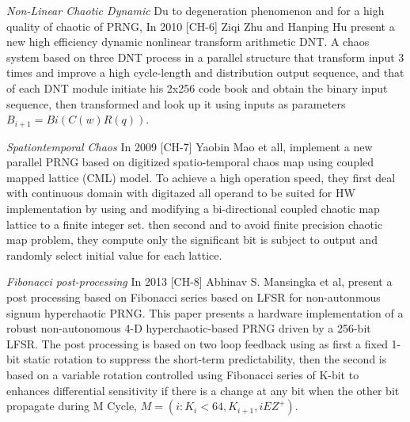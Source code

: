 \textit{Non-Linear Chaotic Dynamic}
Du to degeneration phenomenon and for a high quality of chaotic of PRNG, In 2010 [CH-6] Ziqi Zhu and Hanping Hu present a new high efficiency dynamic nonlinear transform arithmetic DNT. A chaos system based on three DNT process in a parallel structure that transform input 3 times and improve a high cycle-length and distribution output sequence, and that of each DNT module initiate his 2x256 code book and obtain the binary input sequence, then transformed and look up it using inputs as parameters $B_{i+1}= Bi(C(w)R(q))$. 

\textit{Spationtemporal Chaos} In 2009 [CH-7] Yaobin Mao et all, implement a new parallel PRNG based on digitized spatio-temporal chaos map using  coupled mapped lattice (CML) model. To achieve a high operation speed, they first deal with continuous domain with digitazed all operand to be suited for HW implementation by using and modifying a bi-directional coupled chaotic map lattice to a finite integer set. then second and to avoid finite precision chaotic map problem, they compute only the significant bit is subject to output and randomly select initial value for each lattice.  
 
\textit{Fibonacci post-processing} In 2013 [CH-8] Abhinav S. Mansingka et al, present a post processing based on Fibonacci series based on LFSR for non-autonmous signum hyperchaotic PRNG. This paper presents a hardware implementation of a robust non-autonomous 4-D hyperchaotic-based PRNG driven by a 256-bit LFSR. The post processing is based on two loop feedback using as first a fixed 1-bit static rotation to suppress the short-term predictability, then the second is based on  a variable rotation controlled using Fibonacci series of K-bit to enhances differential sensitivity if there is a change at any bit when the other bit propagate during M Cycle, $M=({i: K_{i} < 64, K_{i+1}, iEZ^{+}})$.